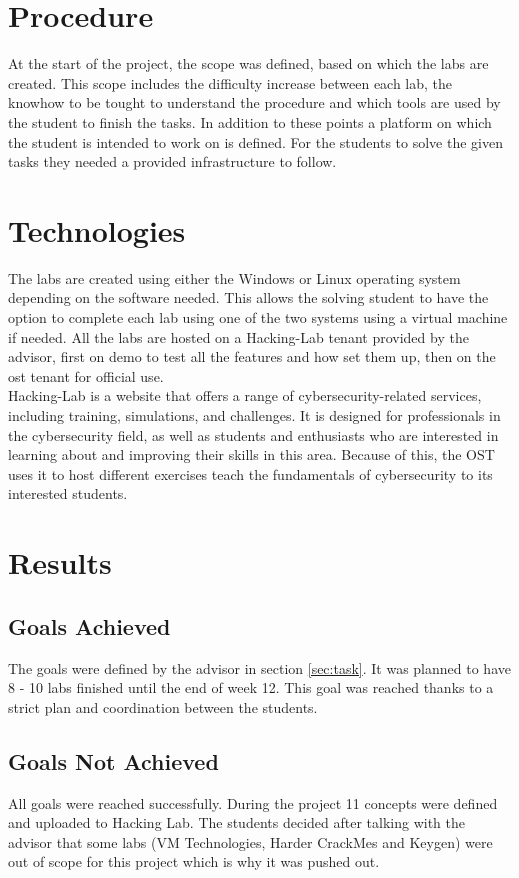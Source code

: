 \section{Procedure}
At the start of the project, the scope was defined, based on which the labs are created. This scope includes the difficulty increase between each lab, the knowhow to be tought to understand the procedure and which tools are used by the student to finish the tasks. In addition to these points a platform on which the student is intended to work on is defined.
For the students to solve the given tasks they needed a provided infrastructure to follow.

\section{Technologies}
The labs are created using either the Windows or Linux operating system depending on the software needed. This allows the solving student to have the option to complete each lab using one of the two systems using a virtual machine if needed. 
All the labs are hosted on a Hacking-Lab tenant provided by the advisor, first on demo to test all the features and how set them up, then on the ost tenant for official use. \\
Hacking-Lab is a website that offers a range of cybersecurity-related services, including training, simulations, and challenges. It is designed for professionals in the cybersecurity field, as well as students and enthusiasts who are interested in learning about and improving their skills in this area.
Because of this, the OST uses it to host different exercises teach the fundamentals of cybersecurity to its interested students.

\section{Results}
\subsection{Goals Achieved}
The goals were defined by the advisor in section \ref{sec:task}. It was planned to have 8 - 10 labs finished until the end of week 12. This goal was reached thanks to a strict plan and coordination between the students.

\subsection{Goals Not Achieved}
All goals were reached successfully. During the project 11 concepts were defined and uploaded to Hacking Lab. The students decided after talking with the advisor that some labs (VM Technologies, Harder CrackMes and Keygen) were out of scope for this project which is why it was pushed out. 

